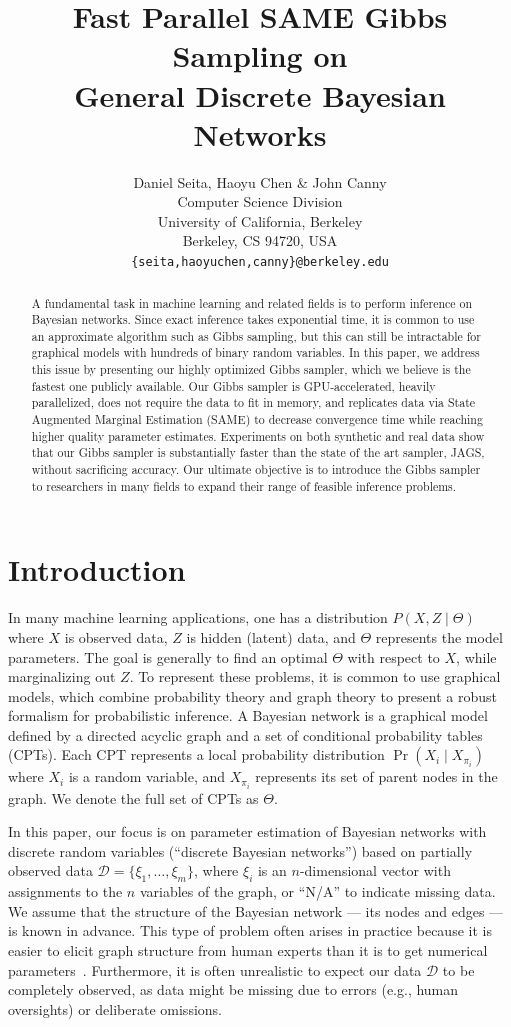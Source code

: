 \documentclass{article} %
\title{Fast Parallel SAME Gibbs Sampling on \\ General Discrete Bayesian Networks}
\author{Daniel Seita, Haoyu Chen \& John Canny \\
Computer Science Division \\
University of California, Berkeley \\
Berkeley, CS 94720, USA \\
\texttt{\{seita,haoyuchen,canny\}@berkeley.edu}
}
\begin{document}
\maketitle

\begin{abstract}
A fundamental task in machine learning and related fields is to perform inference on Bayesian
networks. Since exact inference takes exponential time, it is common to use an approximate algorithm
such as Gibbs sampling, but this can still be intractable for graphical models with hundreds of
binary random variables. In this paper, we address this issue by presenting our highly optimized
Gibbs sampler, which we believe is the fastest one publicly available.  Our Gibbs sampler is
GPU-accelerated, heavily parallelized, does not require the data to fit in memory, and replicates
data via State Augmented Marginal Estimation (SAME) to decrease convergence time while reaching
higher quality parameter estimates.  Experiments on both synthetic and real data show that our Gibbs
sampler is substantially faster than the state of the art sampler, JAGS, without sacrificing
accuracy. Our ultimate objective is to introduce the Gibbs sampler to researchers in many fields to
expand their range of feasible inference problems.
\end{abstract}




\section{Introduction}\label{sec:intro}

In many machine learning applications, one has a distribution $P(X,Z \mid \Theta)$ where $X$ is
observed data, $Z$ is hidden (latent) data, and $\Theta$ represents the model parameters. The goal is
generally to find an optimal $\Theta$ with respect to $X$, while marginalizing out $Z$. To represent
these problems, it is common to use graphical models, which combine probability theory and graph
theory to present a robust formalism for probabilistic inference. A Bayesian network is a graphical
model defined by a directed acyclic graph and a set of conditional probability tables (CPTs). Each
CPT represents a local probability distribution $\Pr(X_i \mid X_{\pi_i})$ where $X_i$ is a random
variable, and $X_{\pi_i}$ represents its set of parent nodes in the graph. We denote the full set of
CPTs as $\Theta$.

In this paper, our focus is on parameter estimation of Bayesian networks with discrete random
variables (``discrete Bayesian networks'') based on partially observed data $\mathcal{D} = \{\xi_1,
\ldots, \xi_m\}$, where $\xi_i$ is an $n$-dimensional vector with assignments to the $n$ variables
of the graph, or ``N/A'' to indicate missing data. We assume that the structure of the Bayesian
network --- its nodes and edges --- is known in advance. This type of problem often arises in
practice because it is easier to elicit graph structure from human experts than it is to get
numerical parameters~\citep{Koller2009}. Furthermore, it is often unrealistic to expect our data
$\mathcal{D}$ to be completely observed, as data might be missing due to errors (e.g., human
oversights) or deliberate omissions.
\end{document}
